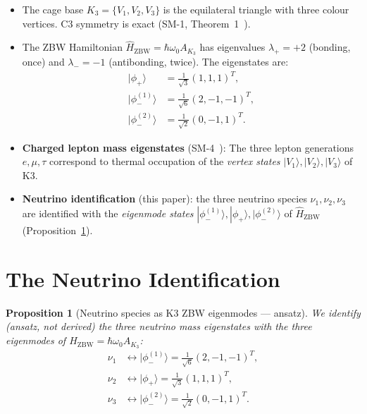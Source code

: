 \documentclass[11pt]{article}
\newtheorem{proposition}[theorem]{Proposition}
\newcommand{\ZBW}{\mathrm{ZBW}}
\begin{document}
\begin{itemize}
\item The cage base $K_3 = \{V_1,V_2,V_3\}$ is the equilateral triangle
  with three colour vertices.  C3 symmetry is exact
  (SM-1, Theorem~1~\cite{abshier_sm1}).

\item The ZBW Hamiltonian $\hat{H}_\ZBW = \hbar\omega_0 A_{K_3}$
  has eigenvalues $\lambda_+ = +2$ (bonding, once) and
  $\lambda_- = -1$ (antibonding, twice).  The eigenstates are:
  \begin{align}
    |\phi_+\rangle &= \tfrac{1}{\sqrt{3}}(1,1,1)^T, \label{eq:phi+}\\
    |\phi_-^{(1)}\rangle &= \tfrac{1}{\sqrt{6}}(2,-1,-1)^T, \label{eq:phim1}\\
    |\phi_-^{(2)}\rangle &= \tfrac{1}{\sqrt{2}}(0,-1,1)^T. \label{eq:phim2}
  \end{align}

\item \textbf{Charged lepton mass eigenstates} (SM-4~\cite{abshier_sm4}):
  The three lepton generations $e, \mu, \tau$ correspond to thermal
  occupation of the \emph{vertex states} $|V_1\rangle, |V_2\rangle,
  |V_3\rangle$ of K3.

\item \textbf{Neutrino identification} (this paper): the three neutrino
  species $\nu_1, \nu_2, \nu_3$ are identified with the \emph{eigenmode
  states} $|\phi_-^{(1)}\rangle, |\phi_+\rangle, |\phi_-^{(2)}\rangle$
  of $\hat{H}_\ZBW$ (Proposition~\ref{prop:nu_id}).
\end{itemize}

\section{The Neutrino Identification}

\begin{proposition}[Neutrino species as K3 ZBW eigenmodes --- ansatz]
\label{prop:nu_id}
We \emph{identify} (ansatz, not derived) the three neutrino mass
eigenstates with the three eigenmodes of
$\hat{H}_\ZBW = \hbar\omega_0 A_{K_3}$:
\begin{align*}
\nu_1 &\leftrightarrow |\phi_-^{(1)}\rangle
  = \tfrac{1}{\sqrt{6}}(2,-1,-1)^T, \\
\nu_2 &\leftrightarrow |\phi_+\rangle
  = \tfrac{1}{\sqrt{3}}(1,1,1)^T, \\
\nu_3 &\leftrightarrow |\phi_-^{(2)}\rangle
  = \tfrac{1}{\sqrt{2}}(0,-1,1)^T.
\end{align*}
\end{proposition}
\end{document}

